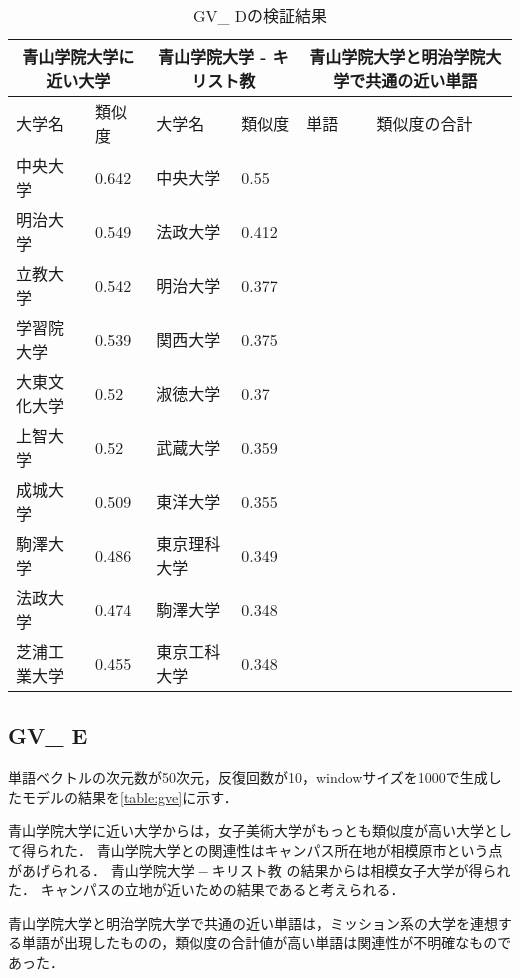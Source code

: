 \begin{table}[H]
\caption{GV\_ Dの検証結果}
\centering
\footnotesize
\begin{tabular}{ll|ll|ll}
\hline
\multicolumn{2}{c}{青山学院大学に近い大学} & \multicolumn{2}{c}{青山学院大学 - キリスト教} & \multicolumn{2}{c}{青山学院大学と明治学院大学で共通の近い単語}
\\ \hline
大学名 & 類似度 & 大学名 & 類似度 & 単語 & 類似度の合計
\\ \hline \hline
中央大学 & 0.642 & 中央大学 & 0.55 & & \\
明治大学 & 0.549 & 法政大学 & 0.412 & & \\
立教大学 & 0.542 & 明治大学 & 0.377 & & \\
学習院大学 & 0.539 & 関西大学 & 0.375 & & \\
大東文化大学 & 0.52 & 淑徳大学 & 0.37 & & \\
上智大学 & 0.52 & 武蔵大学 & 0.359 & & \\
成城大学 & 0.509 & 東洋大学 & 0.355 & & \\
駒澤大学 & 0.486 & 東京理科大学 & 0.349 & & \\
法政大学 & 0.474 & 駒澤大学 & 0.348 & & \\
芝浦工業大学 & 0.455 & 東京工科大学 & 0.348 & & \\ \hline
\end{tabular}
\label{table:gvd}
\end{table}

\subsection{GV\_ E}
単語ベクトルの次元数が50次元，反復回数が10，windowサイズを1000で生成したモデルの結果を\ref{table:gve}に示す．

青山学院大学に近い大学からは，女子美術大学がもっとも類似度が高い大学として得られた．
青山学院大学との関連性はキャンパス所在地が相模原市という点があげられる．
$ 青山学院大学 - キリスト教 $ の結果からは相模女子大学が得られた．
キャンパスの立地が近いための結果であると考えられる．

青山学院大学と明治学院大学で共通の近い単語は，ミッション系の大学を連想する単語が出現したものの，類似度の合計値が高い単語は関連性が不明確なものであった．

